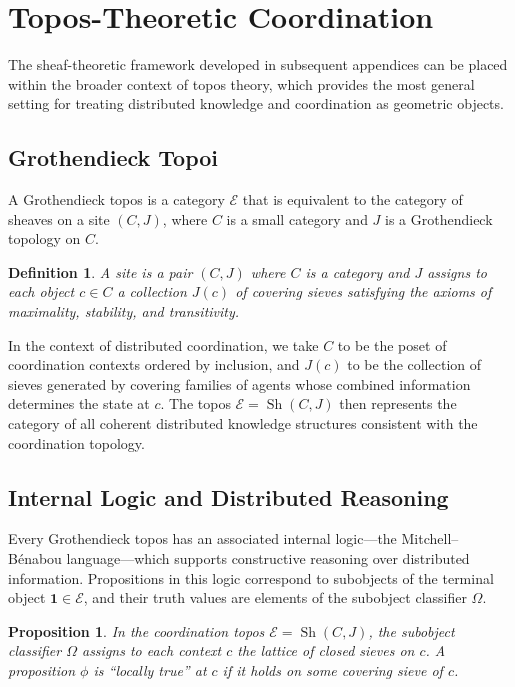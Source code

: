 \documentclass[12pt]{article}
\newtheorem{proposition}[theorem]{Proposition}
\newtheorem{definition}[theorem]{Definition}
\DeclareMathOperator{\sh}{Sh}
\begin{document}
\section{Topos-Theoretic Coordination}
\label{app:topos}

The sheaf-theoretic framework developed in subsequent appendices can be placed within the broader context of topos theory, which provides the most general setting for treating distributed knowledge and coordination as geometric objects.

\subsection{Grothendieck Topoi}

A Grothendieck topos is a category $\mathcal{E}$ that is equivalent to the category of sheaves on a site $(C, J)$, where $C$ is a small category and $J$ is a Grothendieck topology on $C$.

\begin{definition}
A \emph{site} is a pair $(C, J)$ where $C$ is a category and $J$ assigns to each object $c \in C$ a collection $J(c)$ of \emph{covering sieves} satisfying the axioms of maximality, stability, and transitivity.
\end{definition}

In the context of distributed coordination, we take $C$ to be the poset of coordination contexts ordered by inclusion, and $J(c)$ to be the collection of sieves generated by covering families of agents whose combined information determines the state at $c$. The topos $\mathcal{E} = \sh(C,J)$ then represents the category of all coherent distributed knowledge structures consistent with the coordination topology.

\subsection{Internal Logic and Distributed Reasoning}

Every Grothendieck topos has an associated internal logic---the Mitchell--B\'{e}nabou language---which supports constructive reasoning over distributed information. Propositions in this logic correspond to subobjects of the terminal object $\mathbf{1} \in \mathcal{E}$, and their truth values are elements of the subobject classifier $\Omega$.

\begin{proposition}
In the coordination topos $\mathcal{E} = \sh(C,J)$, the subobject classifier $\Omega$ assigns to each context $c$ the lattice of closed sieves on $c$. A proposition $\phi$ is ``locally true'' at $c$ if it holds on some covering sieve of $c$.
\end{proposition}
\end{document}
